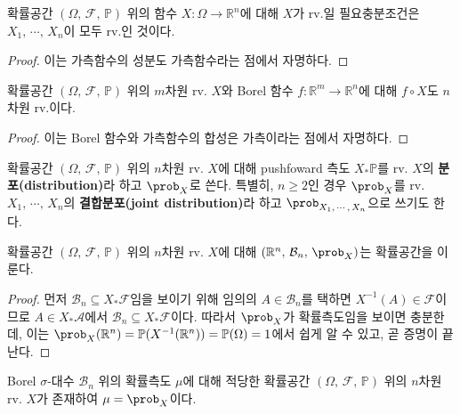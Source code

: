 \begin{proposition}
    확률공간 $(\Omega,\,\mathcal{F},\,\mathbb{P})$ 위의 함수 $X:\Omega\to\mathbb{R}^n$에 대해 $X$가 rv.일 필요충분조건은 $X_1,\,\cdots,\,X_n$이 모두 rv.인 것이다.
\end{proposition}

\begin{proof}
    이는 가측함수의 성분도 가측함수라는 점에서 자명하다.
\end{proof}

\begin{theorem}
    확률공간 $(\Omega,\,\mathcal{F},\,\mathbb{P})$ 위의 $m$차원 rv. $X$와 Borel 함수 $f:\mathbb{R}^m\to\mathbb{R}^n$에 대해 $f\circ X$도 $n$차원 rv.이다.
\end{theorem}

\begin{proof}
    이는 Borel 함수와 가측함수의 합성은 가측이라는 점에서 자명하다.
\end{proof}

\begin{definition}
    확률공간 $(\Omega,\,\mathcal{F},\,\mathbb{P})$ 위의 $n$차원 rv. $X$에 대해 pushfoward 측도 $X_*\mathbb{P}$를 rv. $X$의 \textbf{분포(distribution)}라 하고 $\prob_X$로 쓴다. 특별히, $n\geq2$인 경우 $\prob_X$를 rv. $X_1,\,\cdots,\,X_n$의 \textbf{결합분포(joint distribution)}라 하고 $\prob_{X_1,\,\cdots,\,X_n}$으로 쓰기도 한다.
\end{definition}

\begin{theorem}\label{thm:rvProbSpace}
    확률공간 $(\Omega,\,\mathcal{F},\,\mathbb{P})$ 위의 $n$차원 rv. $X$에 대해 $(\mathbb{R}^n,\,\mathcal{B}_n,\,\prob_X)$는 확률공간을 이룬다.
\end{theorem}

\begin{proof}
    먼저 $\mathcal{B}_n\subseteq X_*\mathcal{F}$임을 보이기 위해 임의의 $A\in\mathcal{B}_n$를 택하면 $X^{-1}(A)\in\mathcal{F}$이므로 $A\in X_*\mathcal{A}$에서 $\mathcal{B}_n\subseteq X_*\mathcal{F}$이다. 따라서 $\prob_X$가 확률측도임을 보이면 충분한데, 이는 $\prob_X(\mathbb{R}^n)=\mathbb{P}(X^{-1}(\mathbb{R}^n))=\mathbb{P}(\Omega)=1$에서 쉽게 알 수 있고, 곧 증명이 끝난다.
\end{proof}

\begin{theorem}\label{thm:probSpaceRv}
    Borel $\sigma$-대수 $\mathcal{B}_n$ 위의 확률측도 $\mu$에 대해 적당한 확률공간 $(\Omega,\,\mathcal{F},\,\mathbb{P})$ 위의 $n$차원 rv. $X$가 존재하여 $\mu=\prob_X$이다.
\end{theorem}

